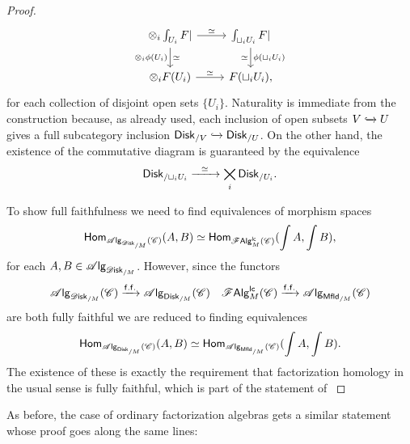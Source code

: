 \documentclass[../text]{subfiles}
\begin{document}
\begin{proof}
    \begin{equation}\label{eq:mult_strut_comm_square}
        \begin{tikzcd}
            \otimes_i \int_{U_i} F| \arrow[r, "\simeq"] \arrow[d, "\otimes_i \phi (U_i)"', "\simeq"] & \int_{\sqcup_i U_i} F| \arrow[d, "\phi (\sqcup_i U_i)", "\simeq"']\\
            \otimes_i F (U_i) \arrow[r, "\simeq"] & F (\sqcup_i U_i),
        \end{tikzcd}
    \end{equation}
    for each collection of disjoint open sets $\{U_i\}$. Naturality is immediate from the construction because, as already used, each inclusion of open subsets $V \xhookrightarrow{} U$ gives a full subcategory inclusion $\disk[r]_{/V} \xhookrightarrow{} \disk[r]_{/U}$. On the other hand, the existence of the commutative diagram is guaranteed by the equivalence
    \begin{equation}
        \disk[r]_{/\sqcup_i U_i} \xrightarrow{\ \ \simeq \ \ } \bigtimes_i \disk[r]_{/U_i}.
    \end{equation}

    To show full faithfulness we need to find equivalences of morphism spaces
    \begin{equation}
        \mathsf{Hom}_{\alg{\disk_{/M}} (\catC)} (A, B) \simeq \mathsf{Hom}_{\lcfa_M (\catC)} (\int A, \int B),
    \end{equation}
    for each $A, B \in \alg{\disk_{/M}}$. However, since the functors
    \begin{align}
        &\alg{\disk_{/M}} (\catC) \xrightarrow{\mathsf{f.f.}} \alg{\disk[r]_{/M}} (\catC) &\lcfa_M (\catC) \xrightarrow{\mathsf{f.f.}} \alg{\mfld[r]_{/M}} (\catC)
    \end{align}
    are both fully faithful we are reduced to finding equivalences
    \begin{equation}
        \mathsf{Hom}_{\alg{\disk[r]_{/M}} (\catC)} (A, B) \simeq \mathsf{Hom}_{\alg{\mfld[r]_{/M}} (\catC)} (\int A, \int B).
    \end{equation}
    The existence of these is exactly the requirement that factorization homology in the usual sense is fully faithful, which is part of the statement of \cite[lem.2.17]{aft_fhstrat}
\end{proof}

As before, the case of ordinary factorization algebras gets a similar statement whose proof goes along the same lines:
\end{document}
